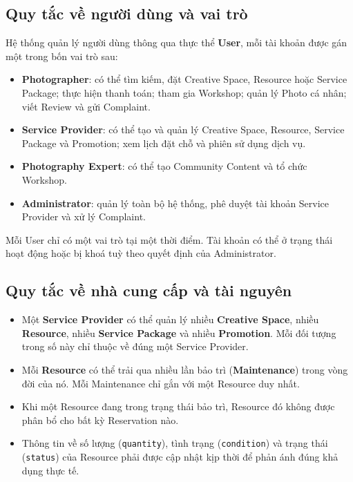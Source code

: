 \subsection{Quy tắc về người dùng và vai trò}

Hệ thống quản lý người dùng thông qua thực thể \textbf{User}, mỗi tài khoản được gán một trong bốn vai trò sau:

\begin{itemize}
    \item \textbf{Photographer}: có thể tìm kiếm, đặt Creative Space, Resource hoặc Service Package; thực hiện thanh toán; tham gia Workshop; quản lý Photo cá nhân; viết Review và gửi Complaint.
    \item \textbf{Service Provider}: có thể tạo và quản lý Creative Space, Resource, Service Package và Promotion; xem lịch đặt chỗ và phiên sử dụng dịch vụ.
    \item \textbf{Photography Expert}: có thể tạo Community Content và tổ chức Workshop.
    \item \textbf{Administrator}: quản lý toàn bộ hệ thống, phê duyệt tài khoản Service Provider và xử lý Complaint.
\end{itemize}

Mỗi User chỉ có một vai trò tại một thời điểm. Tài khoản có thể ở trạng thái hoạt động hoặc bị khoá tuỳ theo quyết định của Administrator.

\subsection{Quy tắc về nhà cung cấp và tài nguyên}

\begin{itemize}
    \item Một \textbf{Service Provider} có thể quản lý nhiều \textbf{Creative Space}, nhiều \textbf{Resource}, nhiều \textbf{Service Package} và nhiều \textbf{Promotion}. Mỗi đối tượng trong số này chỉ thuộc về đúng một Service Provider.
    \item Mỗi \textbf{Resource} có thể trải qua nhiều lần bảo trì (\textbf{Maintenance}) trong vòng đời của nó. Mỗi Maintenance chỉ gắn với một Resource duy nhất.
    \item Khi một Resource đang trong trạng thái bảo trì, Resource đó không được phân bổ cho bất kỳ Reservation nào.
    \item Thông tin về số lượng (\texttt{quantity}), tình trạng (\texttt{condition}) và trạng thái (\texttt{status}) của Resource phải được cập nhật kịp thời để phản ánh đúng khả dụng thực tế.
\end{itemize}

